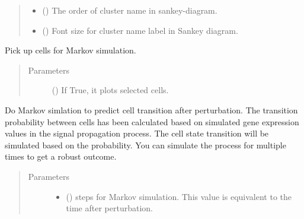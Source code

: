 \documentclass[letterpaper,10pt,english]{sphinxmanual}
\begin{document}
\begin{fulllineitems}
\begin{fulllineitems}
\begin{quote}
\begin{description}
\begin{itemize}
\item {} 
 () \textendash{} The order of cluster name in sankey-diagram.

\item {} 
 () \textendash{} Font size for cluster name label in Sankey diagram.

\end{itemize}

\end{description}\end{quote}

\end{fulllineitems}


\begin{fulllineitems}
\label{\detokenize{modules/celloracle:celloracle.Oracle.prepare_markov_simulation}}
Pick up cells for Markov simulation.
\begin{quote}\begin{description}
\item[{Parameters}] \leavevmode
{} () \textendash{} If True, it plots selected cells.

\end{description}\end{quote}

\end{fulllineitems}


\begin{fulllineitems}
\label{\detokenize{modules/celloracle:celloracle.Oracle.run_markov_chain_simulation}}
Do Markov simlation to predict cell transition after perturbation.
The transition probability between cells has been calculated
based on simulated gene expression values in the signal propagation process.
The cell state transition will be simulated based on the probability.
You can simulate the process for multiple times to get a robust outcome.
\begin{quote}\begin{description}
\item[{Parameters}] \leavevmode\begin{itemize}
\item {} 
 () \textendash{} steps for Markov simulation. This value is equivalent to the time after perturbation.


\end{itemize}
\end{description}
\end{quote}
\end{fulllineitems}
\end{fulllineitems}
\end{document}
